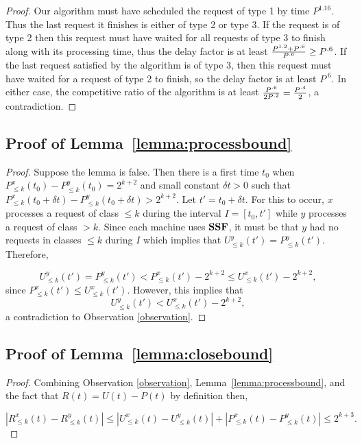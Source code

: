 \documentclass[11pt]{article}
\newcommand{\lemref}[1]{Lemma~\ref{lemma:#1}}
\begin{document}
\begin{proof}
Our algorithm must have scheduled the request of type 1 by time
$P^{1.16}$.  Thus the last request it finishes is either of
type 2 or type 3.  If the request is of type 2 then this request
must have waited for all requests of type 3 to finish along with
its processing time, thus the delay factor is at least
${{P^{1.2} + P^{.6}} \over {P^{.6}}} \geq
P^{.6}$.  If the last request satisfied by the algorithm is
of type 3, then this request must have waited for a request of
type 2 to finish, so the delay factor is at least $P^{.6}$.
In either case, the competitive ratio of the algorithm is at least
${{P^{.6}} \over {2 P^{.2}}} = {{P^{.4}} \over
{2}}$, a contradiction.

\end{proof}

\subsection{Proof of \lemref{processbound}}
\begin{proof}
  Suppose the lemma is false. Then there is a first time $t_0$ when
  $P^{x}_{\leq k} (t_0) - P^{y}_{\leq k} (t_0) = 2^{k+2}$ and small
  constant $\delta t > 0$ such that $P^{x}_{\leq k} (t_0 + \delta t) -
  P^{y}_{\leq k} (t_0 + \delta t) > 2^{k+2}$. Let $t' = t_0+\delta t$.
  For this to occur, $x$ processes a request of class $\le k$ during
  the interval $I = [t_0, t']$ while $y$ processes a request of class
  $> k$. Since each machine uses ${\texttt{\bf{SSF}}}$, it must be that $y$ had no
  requests in classes $\le k$ during $I$ which implies that $U^y_{\le
    k}(t') = P^y_{\le k}(t')$. Therefore,

\[
U^{y}_{\leq k} (t') = P^{y}_{\leq k} (t') < P^{x}_{\leq k} (t') - 2^{k+2}
\le U^{x}_{\leq k} (t') - 2^{k+2},
\]
since $P^{x}_{\leq k} (t') \le U^{x}_{\leq k} (t')$. However, this implies
that
\[
U^{y}_{\leq k} (t') < U^{x}_{\leq k} (t')  - 2^{k+2},
\]
a contradiction to Observation \ref{observation}.
\end{proof}

\subsection{Proof of \lemref{closebound}}

\begin{proof}
Combining Observation \ref{observation}, \lemref{processbound},
and the fact that $R(t) = U(t) - P(t)$ by definition then,

\[
|R^{x}_{\leq k} (t) -  R^{y}_{\leq k}(t)| \le
|U^{x}_{\leq k} (t) -  U^{y}_{\leq k}(t)| + |P^{x}_{\leq k} (t) -  P^{y}_{\leq k}(t)| \le 2^{k+3}.
\]
\end{proof}
\end{document}
